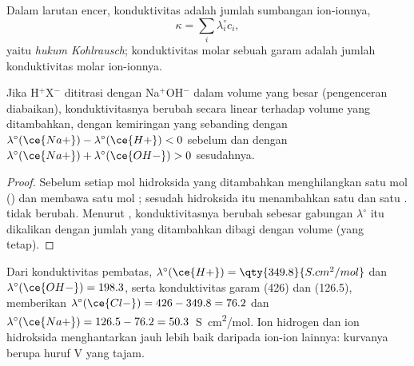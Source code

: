 \begin{proposition}\label{prop:b1:titration-methods:kohlrausch}
Dalam larutan encer, konduktivitas adalah jumlah sumbangan ion-ionnya,
\[
  \kappa = \sum_i \lambda_i^\circ c_i ,
\]
yaitu \emph{hukum Kohlrausch}; konduktivitas
molar sebuah garam adalah jumlah konduktivitas molar ion-ionnya.
\end{proposition}


\begin{proposition}\label{prop:b1:titration-methods:conductimetric-slopes}
Jika  H$^+$X$^-$ dititrasi dengan  Na$^+$OH$^-$ dalam
volume yang besar (pengenceran diabaikan), konduktivitasnya berubah
secara linear terhadap volume yang ditambahkan, dengan kemiringan yang
sebanding dengan $\lambda^\circ(\ce{Na+}) - \lambda^\circ(\ce{H+}) < 0$
sebelum  dan dengan
$\lambda^\circ(\ce{Na+}) + \lambda^\circ(\ce{OH-}) > 0$ sesudahnya.
\end{proposition}

\begin{proof}
Sebelum  setiap mol hidroksida yang ditambahkan menghilangkan
satu mol  () dan membawa satu mol ;
sesudah  hidroksida itu menambahkan satu  dan satu
.  tidak berubah. Menurut ,
konduktivitasnya berubah sebesar gabungan $\lambda^\circ$ itu dikalikan
dengan jumlah yang ditambahkan dibagi dengan volume (yang tetap).
\end{proof}

Dari konduktivitas pembatas, $\lambda^\circ(\ce{H+}) =
\qty{349.8}{S.cm^2/mol}$ dan $\lambda^\circ(\ce{OH-}) = 198.3$, serta
konduktivitas garam  (426) dan  (126.5),  memberikan
$\lambda^\circ(\ce{Cl-}) = 426 - 349.8 = 76.2$ dan $\lambda^\circ(\ce{Na+}) =
126.5 - 76.2 = 50.3$~\unit{S.cm^2/mol}. Ion hidrogen dan ion hidroksida
menghantarkan jauh lebih baik daripada ion-ion lainnya: kurvanya berupa
huruf V yang tajam.

